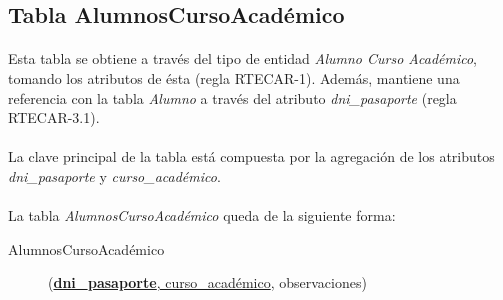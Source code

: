    \subsection{Tabla AlumnosCursoAcadémico}

      \paragraph{}Esta tabla se obtiene a través del tipo de entidad
      \textit{Alumno Curso Académico}, tomando los atributos de ésta (regla
      RTECAR-1). Además, mantiene una referencia con la tabla \textit{Alumno} a
      través del atributo \textit{dni\_pasaporte} (regla RTECAR-3.1).

      \paragraph{}La clave principal de la tabla está compuesta por la
      agregación de los atributos \textit{dni\_pasaporte} y
      \textit{curso\_académico}.

      \paragraph{}La tabla \textit{AlumnosCursoAcadémico} queda de la siguiente
      forma:

      \begin{description}
         \item[AlumnosCursoAcadémico] \begin{flushleft}(\underline{\textbf{dni\_pasaporte},
         curso\_académico}, observaciones)\end{flushleft}
      \end{description}

